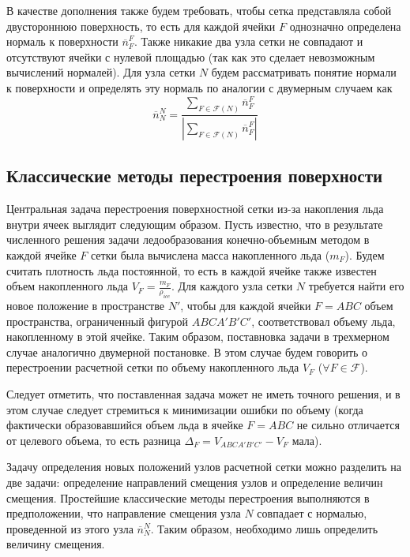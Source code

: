 В качестве дополнения также будем требовать, чтобы сетка представляла собой двустороннюю поверхность, то есть для каждой ячейки $F$ однозначно определена нормаль к поверхности $\overline{n}^F_F$.
Также никакие два узла сетки не совпадают и отсутствуют ячейки с нулевой площадью (так как это сделает невозможным вычислений нормалей).
Для узла сетки $N$ будем рассматривать понятие нормали к поверхности и определять эту нормаль по аналогии с двумерным случаем как
\begin{equation}
\overline{n}_N^N = \frac{\sum_{F \in \mathscr{F}(N)}{\overline{n}_F^F} }{ \left| \sum_{F \in \mathscr{F}(N)}{\overline{n}_F^F} \right| }
\end{equation}


\subsection{Классические методы перестроения поверхности}

Центральная задача перестроения поверхностной сетки из-за накопления льда внутри ячеек выглядит следующим образом.
Пусть известно, что в результате численного решения задачи ледообразования конечно-объемным методом \cite{Beaugendre2003Ice} в каждой ячейке $F$ сетки была вычислена масса накопленного льда ($m_F$).
Будем считать плотность льда постоянной, то есть в каждой ячейке также известен объем накопленного льда $V_F = \frac{m_F}{\rho_{ice}}$.
Для каждого узла сетки $N$ требуется найти его новое положение в пространстве $N'$, чтобы для каждой ячейки $F = ABC$ объем пространства, ограниченный фигурой $ABCA'B'C'$, соответствовал объему льда, накопленному в этой ячейке.
Таким образом, поставновка задачи в трехмерном случае аналогично двумерной постановке.
В этом случае будем говорить о перестроении расчетной сетки по объему накопленного льда $V_F$ ($\forall F \in \mathscr{F}$).

Следует отметить, что поставленная задача может не иметь точного решения, и в этом случае следует стремиться к минимизации ошибки по объему (когда фактически образовавшийся объем льда в ячейке $F = ABC$ не сильно отличается от целевого объема, то есть разница $\Delta_F = V_{ABCA'B'C'} - V_F$ мала).

Задачу определения новых положений узлов расчетной сетки можно разделить на две задачи: определение направлений смещения узлов и определение величин смещения.
Простейшие классические методы перестроения выполняются в предположении, что направление смещения узла $N$ совпадает с нормалью, проведенной из этого узла $\overline{n}_N^N$.
Таким образом, необходимо лишь определить величину смещения.

